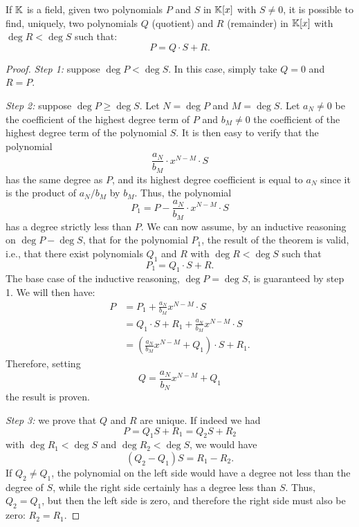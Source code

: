 \begin{theorem}
  \label{th:divisione_polinomi}%
  If ${\mathbb K}$ is a field,
  given two polynomials $P$ and $S$ in ${\mathbb K}[x]$ with $S\neq 0$, it is possible
  to find, uniquely, two polynomials $Q$ (quotient)
  and $R$ (remainder) in ${\mathbb K}[x]$ with $\deg R < \deg S$
  such that:
  \[
    P = Q \cdot S + R.
  \]
  \end{theorem}
  \begin{proof}
  \emph{Step 1:} suppose $\deg P < \deg S$.
  In this case, simply take $Q=0$ and $R=P$.
  
  \emph{Step 2:} suppose $\deg P \ge \deg S$.
  Let $N=\deg P$ and $M=\deg S$.
  Let $a_N\neq 0$ be the coefficient of the highest degree term
  of $P$ and $b_M\neq 0$ the coefficient of the highest degree
  term of the polynomial $S$.
  It is then easy to verify that the polynomial
  \[
  \frac{a_N}{b_M} \cdot x^{N-M}\cdot S
  \]
    has the same degree as $P$, and its highest degree coefficient is equal to
  $a_N$ since it is the product of
  $a_N/b_M$ by $b_M$.
  Thus, the polynomial
  \[
   P_1 = P - \frac{a_N}{b_M} \cdot x^{N-M}\cdot S
  \]
  has a degree strictly less than $P$.
  We can now assume, by an inductive reasoning
  on $\deg P - \deg S$,
  that for the polynomial $P_1$, the result of the theorem is
  valid, i.e.,
  that there exist polynomials $Q_1$ and $R$
  with $\deg R < \deg S$ such that
  \[
    P_1 = Q_1 \cdot S + R.
  \]
  The base case of the inductive reasoning,
  $\deg P = \deg S$, is guaranteed by step 1.
  We will then have:
  \begin{align*}
    P &= P_1 + \frac{a_N}{b_M} x^{N-M}\cdot S\\
      &= Q_1 \cdot S + R_1 + \frac{a_N}{b_M} x^{N-M}\cdot S\\
      &= (\frac{a_N}{b_M} x^{N-M} + Q_1) \cdot S + R_1.
  \end{align*}
  Therefore, setting
  \[
   Q = \frac{a_N}{b_N} x^{N-M} + Q_1
  \]
  the result is proven.
  
  \emph{Step 3:} we prove that $Q$ and $R$ are unique. If indeed we had 
  \[
    P = Q_1 S + R_1 = Q_2 S + R_2   
  \]
  with $\deg R_1<\deg S$ and $\deg R_2 < \deg S$, we would have 
  \[
  (Q_2 - Q_1) S = R_1 - R_2.    
  \]
    If $Q_2 \neq Q_1$, the polynomial on the left side would have a degree not
  less than the degree of
  $S$, while the right side certainly has a degree less than $S$.
    Thus, $Q_2=Q_1$, but then the left side is zero, and therefore the right
  side must
  also be zero: $R_2=R_1$.
  \end{proof}
  
